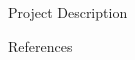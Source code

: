 \documentclass{mfcs}
\begin{document}
\begin{question}{Project Description}
\end{question}

\begin{question}{References}
    \printbibliography[heading=none]
\end{question}
\end{document}
